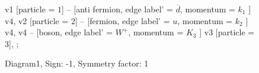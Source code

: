 \documentclass{revtex4}
\begin{document}
\begin{figure}[!htb]
\begin{center}
{    %
v1 [particle = \(1\)] -- [anti fermion, edge label' = \(\overline{d}\), momentum = \(k_{1}\) ] v4, 
v2 [particle = \(2\)] -- [fermion, edge label' = \(u\), momentum = \(k_{2}\) ] v4, 
v4 -- [boson, edge label' = \(W^{+}\), momentum = \(K_{3}\) ] v3 [particle = \(3\)], 
};
\end{center}
\caption{Diagram1, Sign: -1, Symmetry factor: 1}
\end{figure}
\newpage
\end{document}
